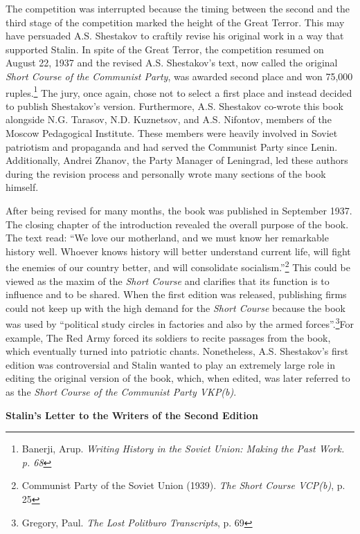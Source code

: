 \documentclass[a4paper, twocolumn]{article}
\begin{document}
The competition was interrupted because the timing between the second
and the third stage of the competition marked the height of the Great
Terror. This may have persuaded A.S. Shestakov to craftily revise his
original work in a way that supported Stalin. In spite of the Great
Terror, the competition resumed on August 22, 1937 and the revised
A.S. Shestakov’s text, now called the original \emph{Short Course of the
Communist Party}, was awarded second place and won 75,000 ruples.\footnote{Banerji, Arup. \emph{Writing History in the Soviet Union: Making the Past Work. p.  68}}
The jury, once again, chose not to select a first place and instead
decided to publish Shestakov’s version. Furthermore, A.S. Shestakov
co-wrote this book alongside N.G. Tarasov, N.D. Kuznetsov, and
A.S. Nifontov, members of the Moscow Pedagogical Institute. These
members were heavily involved in Soviet patriotism and propaganda and
had served the Communist Party since Lenin. Additionally, Andrei
Zhanov, the Party Manager of Leningrad, led these authors during the
revision process and personally wrote many sections of the book
himself.

After being revised for many months, the book was published in
September 1937.  The closing chapter of the introduction revealed the
overall purpose of the book.  The text read: ``We love our motherland,
and we must know her remarkable history well. Whoever knows history
will better understand current life, will fight the enemies of our
country better, and will consolidate socialism.''\footnote{Communist Party of the Soviet Union (1939). \emph{The Short Course VCP(b)}, p. 25} This could be
viewed as the maxim of the \emph{Short Course} and clarifies that its
function is to influence and to be shared. When the first edition was
released, publishing firms could not keep up with the high demand for
the \emph{Short Course} because the book was used by “political study circles
in factories and also by the armed forces”.\footnote{Gregory, Paul. \emph{The Lost Politburo Transcripts}, p. 69}For example, The Red
Army forced its soldiers to recite passages from the book, which
eventually turned into patriotic chants. Nonetheless, A.S. Shestakov’s
first edition was controversial and Stalin wanted to play an extremely
large role in editing the original version of the book, which, when
edited, was later referred to as the \emph{Short Course of the Communist
Party VKP(b)}.


\begin{center}\textbf{Stalin's Letter to the Writers of the Second Edition}\end{center}
\end{document}
